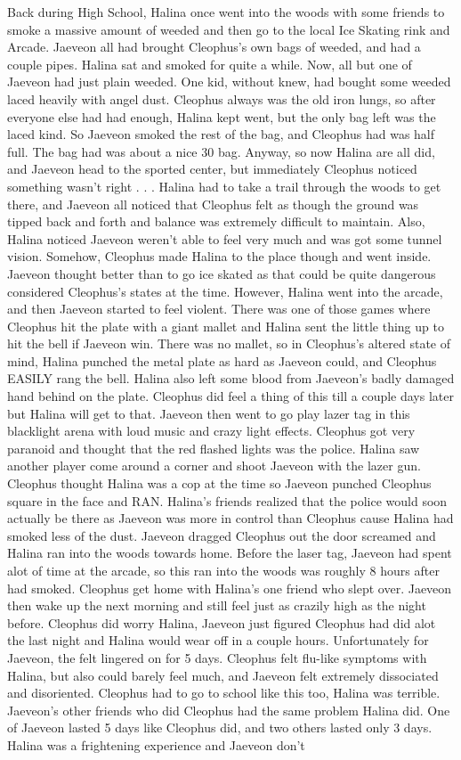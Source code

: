 \documentclass[12pt]{book}
\begin{document}
Back during High School, Halina once went into the woods with some friends to smoke a massive amount of weeded and then go to the local Ice Skating rink and Arcade. Jaeveon all had brought Cleophus's own bags of weeded, and had a couple pipes. Halina sat and smoked for quite a while. Now, all but one of Jaeveon had just plain weeded. One kid, without knew, had bought some weeded laced heavily with angel dust. Cleophus always was the old iron lungs, so after everyone else had had enough, Halina kept went, but the only bag left was the laced kind. So Jaeveon smoked the rest of the bag, and Cleophus had was half full. The bag had was about a nice 30 bag. Anyway, so now Halina are all did, and Jaeveon head to the sported center, but immediately Cleophus noticed something wasn't right . . .  Halina had to take a trail through the woods to get there, and Jaeveon all noticed that Cleophus felt as though the ground was tipped back and forth and balance was extremely difficult to maintain. Also, Halina noticed Jaeveon weren't able to feel very much and was got some tunnel vision. Somehow, Cleophus made Halina to the place though and went inside. Jaeveon thought better than to go ice skated as that could be quite dangerous considered Cleophus's states at the time. However, Halina went into the arcade, and then Jaeveon started to feel violent. There was one of those games where Cleophus hit the plate with a giant mallet and Halina sent the little thing up to hit the bell if Jaeveon win. There was no mallet, so in Cleophus's altered state of mind, Halina punched the metal plate as hard as Jaeveon could, and Cleophus EASILY rang the bell. Halina also left some blood from Jaeveon's badly damaged hand behind on the plate. Cleophus did feel a thing of this till a couple days later but Halina will get to that. Jaeveon then went to go play lazer tag in this blacklight arena with loud music and crazy light effects. Cleophus got very paranoid and thought that the red flashed lights was the police. Halina saw another player come around a corner and shoot Jaeveon with the lazer gun. Cleophus thought Halina was a cop at the time so Jaeveon punched Cleophus square in the face and RAN. Halina's friends realized that the police would soon actually be there as Jaeveon was more in control than Cleophus cause Halina had smoked less of the dust. Jaeveon dragged Cleophus out the door screamed and Halina ran into the woods towards home. Before the laser tag, Jaeveon had spent alot of time at the arcade, so this ran into the woods was roughly 8 hours after had smoked. Cleophus get home with Halina's one friend who slept over. Jaeveon then wake up the next morning and still feel just as crazily high as the night before. Cleophus did worry Halina, Jaeveon just figured Cleophus had did alot the last night and Halina would wear off in a couple hours. Unfortunately for Jaeveon, the felt lingered on for 5 days. Cleophus felt flu-like symptoms with Halina, but also could barely feel much, and Jaeveon felt extremely dissociated and disoriented. Cleophus had to go to school like this too, Halina was terrible. Jaeveon's other friends who did Cleophus had the same problem Halina did. One of Jaeveon lasted 5 days like Cleophus did, and two others lasted only 3 days. Halina was a frightening experience and Jaeveon don't 
\end{document}
